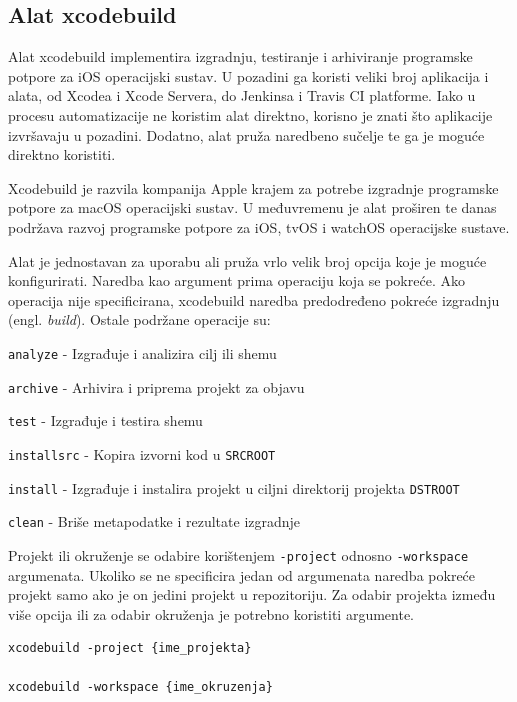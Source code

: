 \documentclass[times, utf8, diplomski, numeric]{fer}
\newcommand{\eng}[1]{(engl. \textit{#1})}
\begin{document}
\begin{appendices}



\chapter{Alat xcodebuild} \label{header:xcodebuild}

Alat xcodebuild implementira izgradnju, testiranje i arhiviranje programske potpore za iOS operacijski sustav. U pozadini ga koristi veliki broj aplikacija i alata, od Xcodea i Xcode Servera, do Jenkinsa i Travis CI platforme. Iako u procesu automatizacije ne koristim alat direktno, korisno je znati što aplikacije izvršavaju u pozadini. Dodatno, alat pruža naredbeno sučelje te ga je moguće direktno koristiti.

Xcodebuild je razvila kompanija Apple krajem za potrebe izgradnje programske potpore za macOS operacijski sustav. U međuvremenu je alat proširen te danas podržava razvoj programske potpore za iOS, tvOS i watchOS operacijske sustave.

Alat je jednostavan za uporabu ali pruža vrlo velik broj opcija koje je moguće konfigurirati. Naredba kao argument prima operaciju koja se pokreće. Ako operacija nije specificirana, xcodebuild naredba predodređeno pokreće izgradnju \eng{build}. Ostale podržane operacije su:

\verb|analyze| - Izgrađuje i analizira cilj ili shemu

\verb|archive| - Arhivira i priprema projekt za objavu

\verb|test| - Izgrađuje i testira shemu

\verb|installsrc| - Kopira izvorni kod u \verb|SRCROOT|

\verb|install| - Izgrađuje i instalira projekt u ciljni direktorij projekta \verb|DSTROOT|

\verb|clean| - Briše metapodatke i rezultate izgradnje

Projekt ili okruženje se odabire korištenjem \verb|-project| odnosno \verb|-workspace| argumenata. Ukoliko se ne specificira jedan od argumenata naredba pokreće projekt samo ako je on jedini projekt u repozitoriju. Za odabir projekta između više opcija ili za odabir okruženja je potrebno koristiti argumente.

\begin{lstlisting}[caption=Odabir projekta i okruženja za obavljanje operacije]
xcodebuild -project {ime_projekta}

xcodebuild -workspace {ime_okruzenja}
\end{lstlisting}


\end{appendices}
\end{document}
